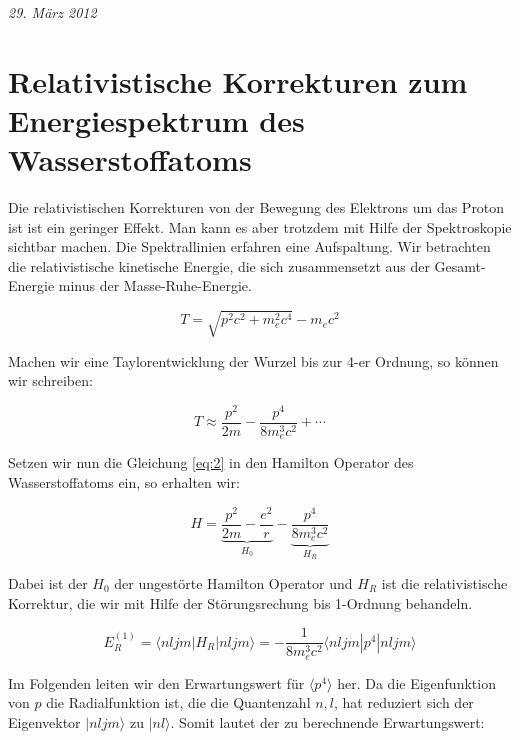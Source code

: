 
\usepackage{amsmath}




\textit{29. März 2012}


\section*{Relativistische Korrekturen zum Energiespektrum des Wasserstoffatoms}


Die relativistischen Korrekturen von der Bewegung des Elektrons um das Proton ist ist ein geringer Effekt. Man kann es aber trotzdem mit Hilfe der Spektroskopie sichtbar machen. Die Spektrallinien erfahren eine Aufspaltung. Wir betrachten die relativistische kinetische Energie, die sich zusammensetzt aus der Gesamt-Energie minus der Masse-Ruhe-Energie.

\begin{equation}
  \label{eq:1}
  T = \sqrt{p^2c^2+m_e^2c^4}-m_ec^2
\end{equation}


Machen wir eine Taylorentwicklung der Wurzel bis zur 4-er Ordnung, so können wir schreiben:

\begin{equation}
  \label{eq:2}
  T \approx \frac{p^2}{2m}-\frac{p^4}{8m_e^3c^2}+\cdots
\end{equation}


Setzen wir nun die Gleichung \eqref{eq:2} in den Hamilton Operator des Wasserstoffatoms ein, so erhalten wir:


\begin{equation}
  \label{eq:3}
  H = \underbrace{\frac{p^2}{2m}-\frac{e^2}{r}}_{H_0}-\underbrace{\frac{p^4}{8m_e^3c^2}}_{H_R}
\end{equation}


Dabei ist der \(H_0\) der ungestörte Hamilton Operator und \(H_R\) ist die relativistische Korrektur, die wir mit Hilfe der Störungsrechung bis 1-Ordnung behandeln.

\begin{equation}
  \label{eq:4}
  E^{(1)}_R = \langle nljm|H_R|nljm\rangle  = - \frac{1}{8m_e^3c^2}\langle nljm|p^4|nljm\rangle
\end{equation}

Im Folgenden leiten wir den Erwartungswert für \(\langle p^4 \rangle \) her. Da die Eigenfunktion von \(p\) die Radialfunktion ist, die die Quantenzahl \(n,l\), hat reduziert sich der Eigenvektor  \(|nljm\rangle \)  zu \(|nl\rangle \). Somit lautet der zu berechnende Erwartungswert:

